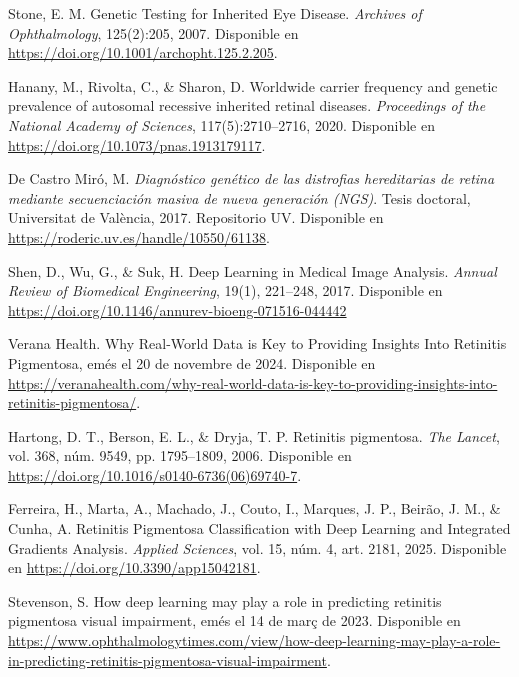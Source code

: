 \documentclass[11pt,spanish,listoffigures,listoftables]{tfgetsinf}
\begin{document}
\begin{thebibliography}{99}
   Stone, E. M.  
   \newblock Genetic Testing for Inherited Eye Disease.  
   \newblock \textit{Archives of Ophthalmology}, 125(2):205, 2007.  
   \newblock Disponible en
   \newblock \url{https://doi.org/10.1001/archopht.125.2.205}.

   Hanany, M., Rivolta, C., \& Sharon, D.  
   \newblock Worldwide carrier frequency and genetic prevalence of autosomal recessive inherited retinal diseases.  
   \newblock \textit{Proceedings of the National Academy of Sciences}, 117(5):2710–2716, 2020.  
   \newblock Disponible en
   \newblock \url{https://doi.org/10.1073/pnas.1913179117}.

   De Castro Miró, M.  
   \newblock \textit{Diagnóstico genético de las distrofias hereditarias de retina mediante secuenciación masiva de nueva generación (NGS)}.  
   \newblock Tesis doctoral, Universitat de València, 2017.  
   \newblock Repositorio UV.  
   \newblock Disponible en
   \newblock \url{https://roderic.uv.es/handle/10550/61138}.

   Shen, D., Wu, G., \& Suk, H.
   \newblock Deep Learning in Medical Image Analysis.
   \newblock \textit{Annual Review of Biomedical Engineering}, 19(1), 221--248, 2017.
   \newblock Disponible en
   \newblock \url{https://doi.org/10.1146/annurev-bioeng-071516-044442}

   Verana Health.  
   \newblock Why Real-World Data is Key to Providing Insights Into Retinitis Pigmentosa,  
   emés el 20 de novembre de 2024.  
   \newblock Disponible en  
   \url{https://veranahealth.com/why-real-world-data-is-key-to-providing-insights-into-retinitis-pigmentosa/}.

   Hartong, D. T., Berson, E. L., \& Dryja, T. P.  
   \newblock Retinitis pigmentosa.  
   \newblock \textit{The Lancet}, vol. 368, núm. 9549, pp. 1795--1809, 2006.  
   \newblock Disponible en  
   \url{https://doi.org/10.1016/s0140-6736(06)69740-7}.

   Ferreira, H., Marta, A., Machado, J., Couto, I., Marques, J. P., Beirão, J. M., \& Cunha, A.  
   \newblock Retinitis Pigmentosa Classification with Deep Learning and Integrated Gradients Analysis.  
   \newblock \textit{Applied Sciences}, vol. 15, núm. 4, art. 2181, 2025.  
   \newblock Disponible en  
   \url{https://doi.org/10.3390/app15042181}.

   Stevenson, S.  
   \newblock How deep learning may play a role in predicting retinitis pigmentosa visual impairment,  
   emés el 14 de març de 2023.  
   \newblock Disponible en  
   \url{https://www.ophthalmologytimes.com/view/how-deep-learning-may-play-a-role-in-predicting-retinitis-pigmentosa-visual-impairment}.


\end{thebibliography}
\end{document}
